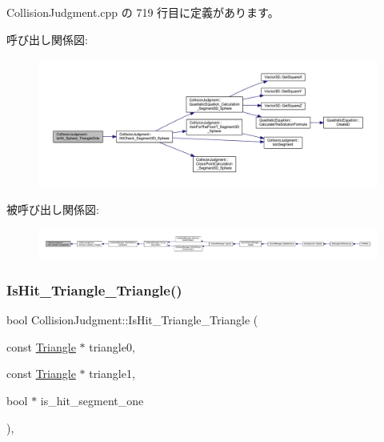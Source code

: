  Collision\+Judgment.\+cpp の 719 行目に定義があります。

呼び出し関係図\+:\nopagebreak
\begin{figure}[H]
\begin{center}
\leavevmode
\includegraphics[width=350pt]{class_collision_judgment_a1bd97fffa0335f66531ba624c3beccda_cgraph}
\end{center}
\end{figure}
被呼び出し関係図\+:
\nopagebreak
\begin{figure}[H]
\begin{center}
\leavevmode
\includegraphics[width=350pt]{class_collision_judgment_a1bd97fffa0335f66531ba624c3beccda_icgraph}
\end{center}
\end{figure}
\mbox{\label{class_collision_judgment_a96728b80c578cd9566677788b5e5fad8}} 
\subsubsection{\texorpdfstring{Is\+Hit\+\_\+\+Triangle\+\_\+\+Triangle()}{IsHit\_Triangle\_Triangle()}}
{\footnotesize\ttfamily bool Collision\+Judgment\+::\+Is\+Hit\+\_\+\+Triangle\+\_\+\+Triangle (\begin{DoxyParamCaption}\item[{const \mbox{\hyperlink{class_triangle}{Triangle}} $\ast$}]{triangle0,  }\item[{const \mbox{\hyperlink{class_triangle}{Triangle}} $\ast$}]{triangle1,  }\item[{bool $\ast$}]{is\+\_\+hit\+\_\+segment\+\_\+one }\end{DoxyParamCaption})\hspace{0.3cm}{\ttfamily [static]}, {\ttfamily [private]}}



